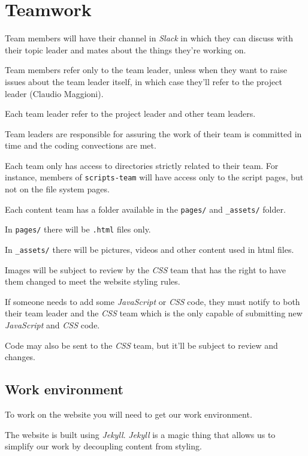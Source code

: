 \documentclass[hidelinks,12pt,a4paper,numbers=enddot]{scrartcl}
\begin{document}
\section{Teamwork}\label{teamwork}

Team members will have their channel in \emph{Slack} in which they can discuss
with their topic leader and mates about the things they're working on.

Team members refer only to the team leader, unless when they want to
raise issues about the team leader itself, in which case they'll refer to the
project leader (Claudio Maggioni).

Each team leader refer to the project leader and other team leaders.

Team leaders are responsible for assuring the work of their team is
committed in time and the coding convections are met.

Each team only has access to directories strictly related to their team.
For instance, members of \texttt{scripts-team} will have access only to
the script pages, but not on the file system pages.

Each content team has a folder available in the \texttt{pages/} and
\texttt{\_assets/} folder.

In \texttt{pages/} there will be \texttt{.html} files only.

In \texttt{\_assets/} there will be pictures, videos and other content used
in html files.

Images will be subject to review by the \emph{CSS} team that has the right to
have them changed to meet the website styling rules.

If someone needs to add some \emph{JavaScript} or \emph{CSS} code, they must notify to
both their team leader and the \emph{CSS} team which is the only capable of
submitting new \emph{JavaScript} and \emph{CSS} code.

Code may also be sent to the \emph{CSS} team, but it'll be subject to review
and changes.

\subsection{Work environment}\label{work-environment}

To work on the website you will need to get our work environment.

The website is built using \emph{Jekyll}. \emph{Jekyll} is a magic thing that
allows us to simplify our work by decoupling content from styling.
\end{document}
